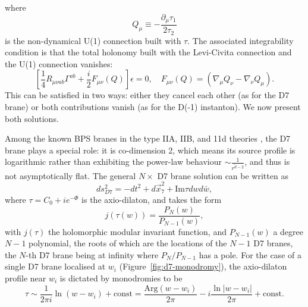 where
\begin{equation}
Q_\mu \equiv -\frac{\partial_\mu \tau_1}{2\tau_2}
\label{def-Qm}
\end{equation}
is the non-dynamical U(1) connection built with $\tau$.
The associated integrability condition is that the total holonomy built with the Levi-Civita connection and the U(1) connection vanishes:
\begin{equation}
\left[\frac{1}{4}R_{\mu\nu ab}\Gamma^{ab}
+ \frac{i}{2}F_{\mu\nu}(Q)\right]
\epsilon = 0,\quad
F_{\mu\nu}(Q)=(\nabla_\mu Q_\nu-\nabla_\nu Q_\mu).
\end{equation}
This can be satisfied in two ways: either they cancel each other (as for the D7 brane) or both contributions vanish (as for the D(-1) instanton).
We now present both solutions.

Among the known BPS branes in the type IIA, IIB, and 11d theories \cite{Stelle:1998xg}, the D7 brane plays a special role: it is co-dimension 2, which means its source profile is logarithmic rather than exhibiting the power-law behaviour $\sim \frac{1}{r^{\tilde{d}-2}}$, and thus is not asymptotically flat.
The general $N \times$ D7 brane solution can be written as \cite{Greene:1989ya,Gibbons:1995vg,Tseytlin:1996ne,Bergshoeff:2006jj}
\begin{equation}
ds_{D7}^2 = -dt^2 + d\vec{x}_7^2 + \text{Im} \tau dw d\bar w,
\label{D7 solution}
\end{equation}
where $\tau = C_0 + i e^{-\Phi}$ is the axio-dilaton, and takes the form
\begin{equation}
j(\tau(w)) = \frac{P_N(w)}{P_{N-1}(w)},
\end{equation}
with $j(\tau)$ the holomorphic modular invariant function, and $P_{N-1}(w)$ a degree $N-1$ polynomial, the roots of which are the locations of the $N-1$ D7 branes, the $N$-th D7 brane being at infinity where $P_N/P_{N-1}$ has a pole.
For the case of a single D7 brane localised at $w_i$ (Figure~\ref{fig:d7-monodromy}), the axio-dilaton profile near $w_i$ is dictated by monodromies to be
\begin{equation}
\tau \sim \frac{1}{2\pi i}\ln (w-w_i)+\text{const}
 = \frac{\text{Arg}(w-w_i)}{2\pi} -i\frac{\ln |w-w_i|}{2\pi}+\text{const}.
 \label{D7 axio-dilaton profile}
\end{equation}

